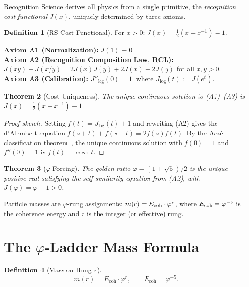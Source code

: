 \documentclass[12pt,a4paper]{article}
\newtheorem{theorem}{Theorem}[section]
\theoremstyle{definition}
\newtheorem{definition}[theorem]{Definition}
\theoremstyle{remark}
\begin{document}
Recognition Science derives all physics from a single primitive,
the \emph{recognition cost functional} $J(x)$, uniquely determined
by three axioms.

\begin{definition}[RS Cost Functional]
For $x > 0$: $J(x) = \tfrac{1}{2}(x + x^{-1}) - 1$.
\end{definition}

\noindent\textbf{Axiom A1 (Normalization):} $J(1) = 0$.\\
\textbf{Axiom A2 (Recognition Composition Law, RCL):}
$J(xy) + J(x/y) = 2J(x)J(y) + 2J(x) + 2J(y)$ for all $x, y > 0$.\\
\textbf{Axiom A3 (Calibration):} $J''_{\log}(0) = 1$, where
$J_{\log}(t) := J(e^t)$.

\begin{theorem}[Cost Uniqueness]
\label{thm:unique}
The unique continuous solution to \textup{(A1)--(A3)} is
$J(x) = \tfrac{1}{2}(x + x^{-1}) - 1$.
\end{theorem}

\begin{proof}[Proof sketch]
Setting $f(t) = J_{\log}(t) + 1$ and rewriting \textup{(A2)} gives the
d'Alembert equation $f(s+t) + f(s-t) = 2f(s)f(t)$.  By the Acz\'el
classification theorem~\cite{Aczel1966}, the unique continuous solution
with $f(0) = 1$ and $f''(0) = 1$ is $f(t) = \cosh t$.
\end{proof}

\begin{theorem}[$\varphi$ Forcing]
\label{thm:phi}
The golden ratio $\varphi = (1+\sqrt{5})/2$ is the unique positive
real satisfying the self-similarity equation from \textup{(A2)},
with $J(\varphi) = \varphi - 1 > 0$.
\end{theorem}

\noindent Particle masses are $\varphi$-rung assignments:
$m(r) = E_{\rm coh} \cdot \varphi^r$, where $E_{\rm coh} = \varphi^{-5}$
is the coherence energy and $r$ is the integer (or effective) rung.

\section{The $\varphi$-Ladder Mass Formula}
\label{sec:ladder}

\begin{definition}[Mass on Rung $r$]
\begin{equation}
  m(r) = E_{\mathrm{coh}} \cdot \varphi^r,
  \qquad E_{\mathrm{coh}} = \varphi^{-5}.
\end{equation}
\end{definition}
\end{document}
